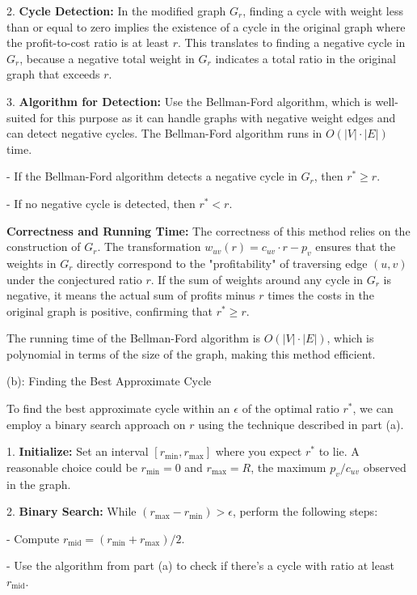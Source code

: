 \documentclass{oxmathproblems}
\begin{document}
\begin{questions}
2. \textbf{Cycle Detection:} In the modified graph $G_r$, finding a cycle with weight less than or equal to zero implies the existence of a cycle in the original graph where the profit-to-cost ratio is at least $r$. This translates to finding a negative cycle in $G_r$, because a negative total weight in $G_r$ indicates a total ratio in the original graph that exceeds $r$.

3. \textbf{Algorithm for Detection:} Use the Bellman-Ford algorithm, which is well-suited for this purpose as it can handle graphs with negative weight edges and can detect negative cycles. The Bellman-Ford algorithm runs in $O(|V| \cdot |E|)$ time.

   - If the Bellman-Ford algorithm detects a negative cycle in $G_r$, then $r^* \geq r$.
   
   - If no negative cycle is detected, then $r^* < r$.

\textbf{Correctness and Running Time:}
The correctness of this method relies on the construction of $G_r$. The transformation $w_{uv}(r) = c_{uv} \cdot r - p_v$ ensures that the weights in $G_r$ directly correspond to the "profitability" of traversing edge $(u, v)$ under the conjectured ratio $r$. If the sum of weights around any cycle in $G_r$ is negative, it means the actual sum of profits minus $r$ times the costs in the original graph is positive, confirming that $r^* \geq r$.

The running time of the Bellman-Ford algorithm is $O(|V| \cdot |E|)$, which is polynomial in terms of the size of the graph, making this method efficient.

(b): Finding the Best Approximate Cycle

To find the best approximate cycle within an $\epsilon$ of the optimal ratio $r^*$, we can employ a binary search approach on $r$ using the technique described in part (a).

1. \textbf{Initialize:} Set an interval $[r_{\text{min}}, r_{\text{max}}]$ where you expect $r^*$ to lie. A reasonable choice could be $r_{\text{min}} = 0$ and $r_{\text{max}} = R$, the maximum $p_v/c_{uv}$ observed in the graph.

2. \textbf{Binary Search:} While $(r_{\text{max}} - r_{\text{min}}) > \epsilon$, perform the following steps:

   - Compute $r_{\text{mid}} = (r_{\text{min}} + r_{\text{max}})/2$.
   
   - Use the algorithm from part (a) to check if there's a cycle with ratio at least $r_{\text{mid}}$.
   

\end{questions}
\end{document}
